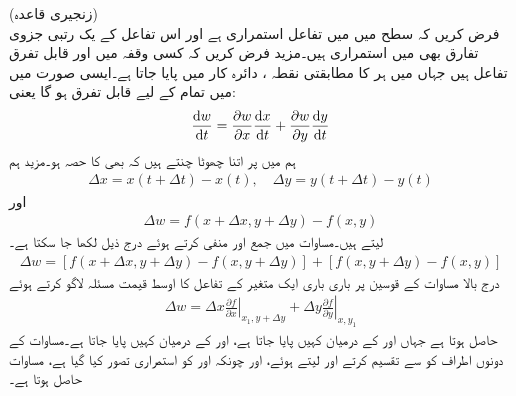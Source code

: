 \quad (زنجیری قاعدہ)\\
فرض کریں کہ  سطح میں   میں تفاعل  استمراری ہے  اور  اس تفاعل کے یک رتبی جزوی تفارق بھی  میں استمراری ہیں۔مزید فرض کریں کہ کسی وقفہ  میں  اور  قابل تفرق تفاعل ہیں جہاں  میں ہر  کا مطابقتی  نقطہ ، دائرہ کار  میں پایا جاتا ہے۔ایسی صورت میں  میں تمام  کے لیے   قابل تفرق ہو گا یعنی:
\begin{align}\label{مساوات_الاحصاء_زنجیری_تفرق_قاعدہ_الف}
\frac{\dif w}{\dif t}=\frac{\partial w}{\partial x}\frac{\dif x}{\dif t}+\frac{\partial w}{\partial y}\frac{\dif y}{\dif t}
\end{align}   
ہم  میں   پر  اتنا چھوٹا چنتے ہیں کہ  بھی  کا حصہ ہو۔مزید ہم 
\begin{align}\label{مساوات_الاحصاء_زنجیری_الف}
\Delta x=x(t+\Delta t)-x(t),\quad \Delta y=y(t+\Delta t)-y(t)
\end{align} 
اور
\begin{align}\label{مساوات_الاحصاء_زنجیری_ب}
\Delta w=f(x+\Delta x,y+\Delta y)-f(x,y)
\end{align}
لیتے ہیں۔مساوات  میں  جمع اور منفی کرتے ہوئے درج ذیل لکھا جا سکتا ہے۔
\begin{align*}
\Delta w=[f(x+\Delta x,y+\Delta y)-f(x,y+\Delta y)]+[f(x,y+\Delta y)-f(x,y)]
\end{align*}
درج بالا مساوات کے قوسین پر باری باری ایک متغیر کے تفاعل کا اوسط قیمت مسئلہ لاگو کرتے ہوئے
\begin{align}\label{مساوات_الاحصاء_زنجیری_پ}
\Delta w=\Delta x \left.\frac{\partial f}{\partial x} \right|_{x_1,y+\Delta y}+\Delta y \left.\frac{\partial f}{\partial y} \right|_{x,y_1}
\end{align}  
حاصل ہوتا ہے جہاں  اور  کے درمیان کہیں  پایا جاتا ہے،  اور  کے درمیان کہیں  پایا جاتا ہے۔مساوات  کے دونوں اطراف کو  سے تقسیم کرتے اور  لیتے ہوئے، اور چونکہ
  اور  کو استمراری تصور کیا گیا ہے، مساوات   حاصل ہوتا ہے۔

